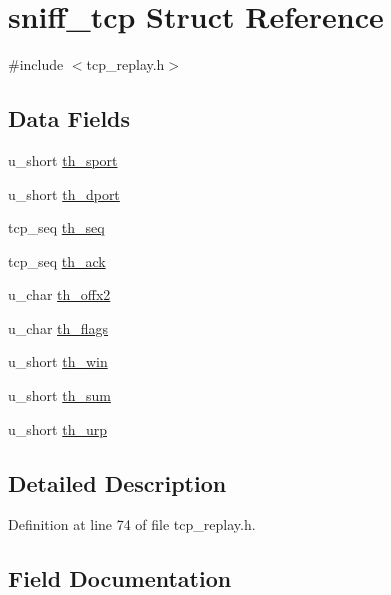 \hypertarget{structsniff__tcp}{}\section{sniff\+\_\+tcp Struct Reference}
\label{structsniff__tcp}


{\ttfamily \#include $<$tcp\+\_\+replay.\+h$>$}

\subsection*{Data Fields}
\begin{DoxyCompactItemize}
\item 
u\+\_\+short \hyperlink{structsniff__tcp_a5e1d1fa7768982723be5744a51879808}{th\+\_\+sport}
\item 
u\+\_\+short \hyperlink{structsniff__tcp_a37d114fb55caf341580c9f5e0a7f02fa}{th\+\_\+dport}
\item 
tcp\+\_\+seq \hyperlink{structsniff__tcp_afab43800cff00c41aa2613ecc0b2dc1e}{th\+\_\+seq}
\item 
tcp\+\_\+seq \hyperlink{structsniff__tcp_a511df676afae80f7e0178171fe52f384}{th\+\_\+ack}
\item 
u\+\_\+char \hyperlink{structsniff__tcp_a833ba21e8249bf10ef30a1f33c7cf09b}{th\+\_\+offx2}
\item 
u\+\_\+char \hyperlink{structsniff__tcp_ab8f5a4df32a495ca5854843860b4ce99}{th\+\_\+flags}
\item 
u\+\_\+short \hyperlink{structsniff__tcp_a989680416292b60851bf0866e2869c86}{th\+\_\+win}
\item 
u\+\_\+short \hyperlink{structsniff__tcp_a03becc73ab66b1d3b5f57da6bc1ac7a1}{th\+\_\+sum}
\item 
u\+\_\+short \hyperlink{structsniff__tcp_a567fe40cad6d66b08c3d7b4420111c38}{th\+\_\+urp}
\end{DoxyCompactItemize}


\subsection{Detailed Description}


Definition at line 74 of file tcp\+\_\+replay.\+h.



\subsection{Field Documentation}
\mbox{\label{structsniff__tcp_a511df676afae80f7e0178171fe52f384}} 
